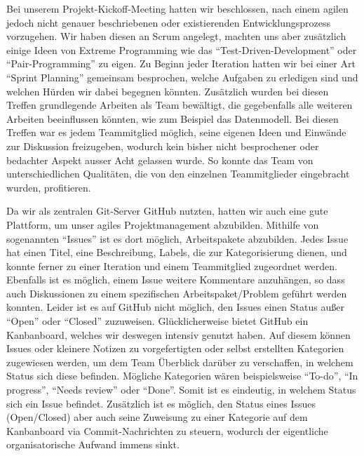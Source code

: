 \documentclass[12pt,DIV14,BCOR10mm,a4paper,parskip=half-,headsepline,headinclude,english,ngerman,bibliography=totocnumbered]{scrreprt}
\begin{document}
Bei unserem Projekt-Kickoff-Meeting hatten wir beschlossen, nach einem agilen jedoch nicht genauer beschriebenen oder existierenden Entwicklungsprozess vorzugehen. Wir haben diesen an Scrum angelegt, machten uns aber zusätzlich einige Ideen von Extreme Programming wie das \enquote{Test-Driven-Development} oder \enquote{Pair-Programming} zu eigen.
Zu Beginn jeder Iteration hatten wir bei einer Art \enquote{Sprint Planning} gemeinsam besprochen, welche Aufgaben zu erledigen sind und welchen Hürden wir dabei begegnen könnten. Zusätzlich wurden bei diesen Treffen grundlegende Arbeiten als Team bewältigt, die gegebenfalls alle weiteren Arbeiten beeinflussen könnten, wie zum Beispiel das Datenmodell.
Bei diesen Treffen war es jedem Teammitglied möglich, seine eigenen Ideen und Einwände zur Diskussion freizugeben, wodurch kein bisher nicht besprochener oder bedachter Aspekt ausser Acht gelassen wurde. So konnte das Team von unterschiedlichen Qualitäten, die von den einzelnen Teammitglieder eingebracht wurden, profitieren.

Da wir als zentralen Git-Server GitHub nutzten, hatten wir auch eine gute Plattform, um unser agiles Projektmanagement abzubilden.
Mithilfe von sogenannten \enquote{Issues} ist es dort möglich, Arbeitspakete abzubilden.
Jedes Issue hat einen Titel, eine Beschreibung, Labels, die zur Kategorisierung dienen, und konnte ferner zu einer Iteration und einem Teammitglied zugeordnet werden.
Ebenfalls ist es möglich, einem Issue weitere Kommentare anzuhängen, so dass auch Diskussionen zu einem spezifischen Arbeitspaket/Problem geführt werden konnten.
Leider ist es auf GitHub nicht möglich, den Issues einen Status außer \enquote{Open} oder \enquote{Closed} zuzuweisen.
Glücklicherweise bietet GitHub ein Kanbanboard, welches wir deswegen intensiv genutzt haben.
Auf diesem können Issues oder kleinere Notizen zu vorgefertigten oder selbst erstellten Kategorien zugewiesen werden, um dem Team Überblick darüber zu verschaffen, in welchem Status sich diese befinden. Mögliche Kategorien wären beispielsweise \enquote{To-do}, \enquote{In progress}, \enquote{Needs review} oder \enquote{Done}.
Somit ist es eindeutig, in welchem Status sich ein Issue befindet.
Zusätzlich ist es möglich, den Status eines Issues (Open/Closed) aber auch seine Zuweisung zu einer Kategorie auf dem Kanbanboard via Commit-Nachrichten zu steuern, wodurch der eigentliche organisatorische Aufwand immens sinkt.
\end{document}
